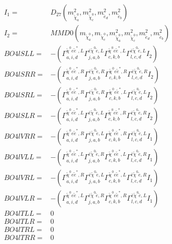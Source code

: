 \documentclass[A4,landscape]{article}
\begin{document}
\begin{align} 
I_1 = & D_{27}(m^2_{\tilde{\chi}^0_{{a}}}, m^2_{\tilde{\chi}^0_{{c}}}, m^2_{\tilde{e}_{{d}}}, m^2_{\tilde{e}_{{b}}}) \\ 
I_2 = & MMD0(m_{\tilde{\chi}^0_{{a}}}, m_{\tilde{\chi}^0_{{c}}}, m^2_{\tilde{\chi}^0_{{a}}}, m^2_{\tilde{\chi}^0_{{c}}}, m^2_{\tilde{e}_{{d}}}, m^2_{\tilde{e}_{{b}}}) \\ 
  BO4lSLL= & -( \Gamma^{\tilde{\chi}^0 e \tilde{e}^*,L}_{a, i, d} \Gamma^{\bar{e}\tilde{\chi}^0 \tilde{e} ,L}_{j, a, b} \Gamma^{\tilde{\chi}^0 e \tilde{e}^*,L}_{c, k, b} \Gamma^{\bar{e}\tilde{\chi}^0 \tilde{e} ,L}_{l, c, d} I_2) \\ 
  BO4lSRR= & -( \Gamma^{\tilde{\chi}^0 e \tilde{e}^*,R}_{a, i, d} \Gamma^{\bar{e}\tilde{\chi}^0 \tilde{e} ,R}_{j, a, b} \Gamma^{\tilde{\chi}^0 e \tilde{e}^*,R}_{c, k, b} \Gamma^{\bar{e}\tilde{\chi}^0 \tilde{e} ,R}_{l, c, d} I_2) \\ 
  BO4lSRL= & -( \Gamma^{\tilde{\chi}^0 e \tilde{e}^*,R}_{a, i, d} \Gamma^{\bar{e}\tilde{\chi}^0 \tilde{e} ,R}_{j, a, b} \Gamma^{\tilde{\chi}^0 e \tilde{e}^*,L}_{c, k, b} \Gamma^{\bar{e}\tilde{\chi}^0 \tilde{e} ,L}_{l, c, d} I_2) \\ 
  BO4lSLR= & -( \Gamma^{\tilde{\chi}^0 e \tilde{e}^*,L}_{a, i, d} \Gamma^{\bar{e}\tilde{\chi}^0 \tilde{e} ,L}_{j, a, b} \Gamma^{\tilde{\chi}^0 e \tilde{e}^*,R}_{c, k, b} \Gamma^{\bar{e}\tilde{\chi}^0 \tilde{e} ,R}_{l, c, d} I_2) \\ 
  BO4lVRR= & -( \Gamma^{\tilde{\chi}^0 e \tilde{e}^*,R}_{a, i, d} \Gamma^{\bar{e}\tilde{\chi}^0 \tilde{e} ,L}_{j, a, b} \Gamma^{\tilde{\chi}^0 e \tilde{e}^*,R}_{c, k, b} \Gamma^{\bar{e}\tilde{\chi}^0 \tilde{e} ,L}_{l, c, d} I_1) \\ 
  BO4lVLL= & -( \Gamma^{\tilde{\chi}^0 e \tilde{e}^*,L}_{a, i, d} \Gamma^{\bar{e}\tilde{\chi}^0 \tilde{e} ,R}_{j, a, b} \Gamma^{\tilde{\chi}^0 e \tilde{e}^*,L}_{c, k, b} \Gamma^{\bar{e}\tilde{\chi}^0 \tilde{e} ,R}_{l, c, d} I_1) \\ 
  BO4lVRL= & -( \Gamma^{\tilde{\chi}^0 e \tilde{e}^*,R}_{a, i, d} \Gamma^{\bar{e}\tilde{\chi}^0 \tilde{e} ,L}_{j, a, b} \Gamma^{\tilde{\chi}^0 e \tilde{e}^*,L}_{c, k, b} \Gamma^{\bar{e}\tilde{\chi}^0 \tilde{e} ,R}_{l, c, d} I_1) \\ 
  BO4lVLR= & -( \Gamma^{\tilde{\chi}^0 e \tilde{e}^*,L}_{a, i, d} \Gamma^{\bar{e}\tilde{\chi}^0 \tilde{e} ,R}_{j, a, b} \Gamma^{\tilde{\chi}^0 e \tilde{e}^*,R}_{c, k, b} \Gamma^{\bar{e}\tilde{\chi}^0 \tilde{e} ,L}_{l, c, d} I_1) \\ 
  BO4lTLL= & 0 \\ 
  BO4lTLR= & 0 \\ 
  BO4lTRL= & 0 \\ 
  BO4lTRR= & 0 \\ 
\end{align} 
\end{document}
